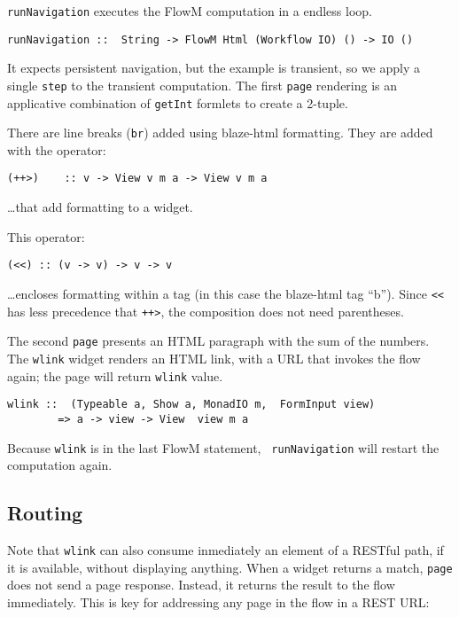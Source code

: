 \documentclass{tmr}
\begin{document}
{\tt runNavigation} executes the FlowM computation in a endless loop. 
 
{\tt 
 
\begin{verbatim} 
runNavigation ::  String -> FlowM Html (Workflow IO) () -> IO () 
\end{verbatim} 
 
} 
It expects persistent navigation, but the example is transient, so we apply a single {\tt step} to the transient computation. The first {\tt page} rendering is an applicative combination of {\tt getInt} formlets to create a 2-tuple. 

There are line breaks ({\tt br}) added using blaze-html formatting. They are added with the operator: 
 
{\tt 
 
\begin{verbatim} 
(++>)    :: v -> View v m a -> View v m a 
\end{verbatim} 
 
} 
 
\ldots that add formatting to a widget.

This operator:

{\tt 
 
\begin{verbatim} 
(<<) :: (v -> v) -> v -> v
\end{verbatim} 
 
} 
\ldots encloses formatting within a tag (in this case the blaze-html tag ``b'').  Since {\tt <<} has less precedence that {\tt ++>}, the composition does not need parentheses.
 
The second {\tt page} presents an HTML paragraph with the sum of the 
numbers. The {\tt wlink} widget renders an HTML link, with a URL that invokes the flow again; the page will return {\tt wlink} value.
 
{\tt 
 
\begin{verbatim} 
wlink ::  (Typeable a, Show a, MonadIO m,  FormInput view) 
        => a -> view -> View  view m a 
\end{verbatim} 
 
} 
Because {\tt wlink} is in the last FlowM statement, {\tt 
runNavigation} will restart the computation again. 
 
\subsection{Routing} 
Note that {\tt wlink} can also consume inmediately an element of a RESTful path, if it is available, without displaying anything. When a widget returns a match, {\tt page} does not send a page response. Instead, it returns the result to the flow immediately. This is key for addressing any page in the flow in a REST URL\@: 
 
\end{document}
